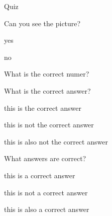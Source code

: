 \documentclass[letterpaper,10pt]{article}
\begin{document}
\begin{center}
{\Large Quiz}
\end{center}


\begin{compactenum} 
\begin{minipage}{\linewidth}
    \item \label{1} Can you see the picture?
    \begin{compactenum} 
        \item \label{11} yes
        \item \label{12} no
    \end{compactenum}
    
    \end{minipage}

    \vspace{10pt}

\begin{minipage}{\linewidth}
    \item \label{2} What is the correct numer?
    
    \end{minipage}

    \vspace{10pt}

\begin{minipage}{\linewidth}
    \item \label{3} What is the correct answer?
    \begin{compactenum} 
        \item \label{31} this is the correct answer
        \item \label{32} this is not the correct answer
        \item \label{33} this is also not the correct answer
    \end{compactenum}
    
    \end{minipage}

    \vspace{10pt}

\begin{minipage}{\linewidth}
    \item \label{4} What answers are correct?
    \begin{compactenum} 
        \item \label{41} this is a correct answer
        \item \label{42} this is not a correct answer
        \item \label{43} this is also a correct answer
    \end{compactenum}
    

\end{minipage}
\end{compactenum}
\end{document}
